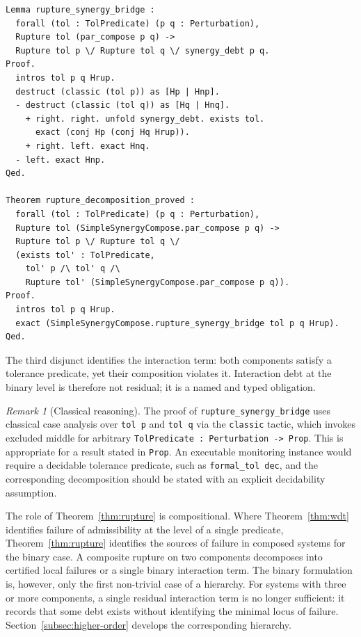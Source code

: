 \documentclass[pdflatex,sn-mathphys-num]{sn-jnl}
\theoremstyle{plain}
\theoremstyle{definition}
\theoremstyle{remark}
\newtheorem{remark}[theorem]{Remark}
\begin{document}
\begin{lstlisting}[style=rocq,
caption={Proved rupture decomposition.}]
Lemma rupture_synergy_bridge :
  forall (tol : TolPredicate) (p q : Perturbation),
  Rupture tol (par_compose p q) ->
  Rupture tol p \/ Rupture tol q \/ synergy_debt p q.
Proof.
  intros tol p q Hrup.
  destruct (classic (tol p)) as [Hp | Hnp].
  - destruct (classic (tol q)) as [Hq | Hnq].
    + right. right. unfold synergy_debt. exists tol.
      exact (conj Hp (conj Hq Hrup)).
    + right. left. exact Hnq.
  - left. exact Hnp.
Qed.

Theorem rupture_decomposition_proved :
  forall (tol : TolPredicate) (p q : Perturbation),
  Rupture tol (SimpleSynergyCompose.par_compose p q) ->
  Rupture tol p \/ Rupture tol q \/
  (exists tol' : TolPredicate,
    tol' p /\ tol' q /\
    Rupture tol' (SimpleSynergyCompose.par_compose p q)).
Proof.
  intros tol p q Hrup.
  exact (SimpleSynergyCompose.rupture_synergy_bridge tol p q Hrup).
Qed.
\end{lstlisting}

The third disjunct identifies the interaction term: both components
satisfy a tolerance predicate, yet their composition violates it.
Interaction debt at the binary level is therefore not residual; it is
a named and typed obligation.

\begin{remark}[Classical reasoning]
The proof of \texttt{rupture\_synergy\_bridge} uses classical case
analysis over \texttt{tol p} and \texttt{tol q} via the \texttt{classic}
tactic, which invokes excluded middle for arbitrary
\texttt{TolPredicate : Perturbation -> Prop}.
This is appropriate for a result stated in \texttt{Prop}.
An executable monitoring instance would require a decidable tolerance
predicate, such as \texttt{formal\_tol dec}, and the corresponding
decomposition should be stated with an explicit decidability assumption.
\end{remark}

The role of Theorem~\ref{thm:rupture} is compositional.
Where Theorem~\ref{thm:wdt} identifies failure of admissibility at the
level of a single predicate, Theorem~\ref{thm:rupture} identifies the
sources of failure in composed systems for the binary case.
A composite rupture on two components decomposes into certified local
failures or a single binary interaction term.
The binary formulation is, however, only the first non-trivial case of
a hierarchy.
For systems with three or more components, a single residual
interaction term is no longer sufficient: it records that some debt
exists without identifying the minimal locus of failure.
Section~\ref{subsec:higher-order} develops the corresponding hierarchy.
\end{document}
